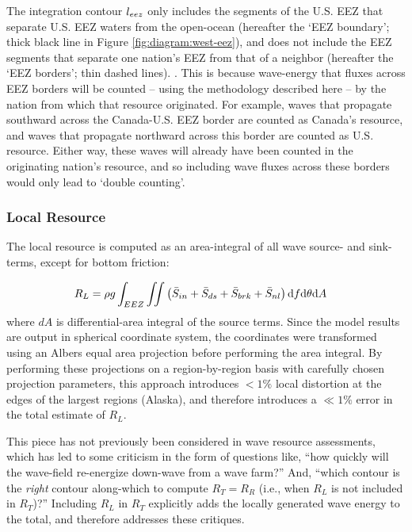 The integration contour $l_{eez}$ only includes the segments of the U.S. EEZ that separate U.S. EEZ waters from the open-ocean (hereafter the `EEZ boundary'; thick black line in Figure \ref{fig:diagram:west-eez}), and does not include the EEZ segments that separate one nation's EEZ from that of a neighbor (hereafter the `EEZ borders'; thin dashed lines). \citep[]{flandersmarineinstituteMaritimeBoundariesGeodatabase2018}. This is because wave-energy that fluxes across EEZ borders will be counted -- using the methodology described here -- by the nation from which that resource originated. For example, waves that propagate southward across the Canada-U.S. EEZ border are counted as Canada's resource, and waves that propagate northward across this border are counted as U.S. resource. Either way, these waves will already have been counted in the originating nation's resource, and so including wave fluxes across these borders would only lead to `double counting'.


\subsubsection{Local Resource} \label{sec:method:calc:local}

The local resource is computed as an area-integral of all wave source- and sink-terms, except for bottom friction:

\begin{align}
  R_L &= \rho g \int_{EEZ}\iint \left ( \bar{S}_{in} + \bar{S}_{ds} + \bar{S}_{brk} + \bar{S}_{nl} \right ) \mathrm{d} f \mathrm{d} \theta \mathrm{d} A
\label{eqn:RL}
\end{align}
where $dA$ is differential-area integral of the source terms. Since the model results are output in spherical coordinate system, the coordinates were transformed using an Albers equal area projection before performing the area integral. By performing these projections on a region-by-region basis with carefully chosen projection parameters, this approach introduces $<1\% $ local distortion at the edges of the largest regions (Alaska), and therefore introduces a $\ll 1\%$ error in the total estimate of $R_L$.

This piece has not previously been considered in wave resource assessments, which has led to some criticism in the form of questions like, ``how quickly will the wave-field re-energize down-wave from a wave farm?''  And, ``which contour is the {\em right} contour along-which to compute $R_T = R_R$ (i.e., when $R_L$ is not included in $R_T$)?'' Including $R_L$ in $R_T$ explicitly adds the locally generated wave energy to the total, and therefore addresses these critiques. 

